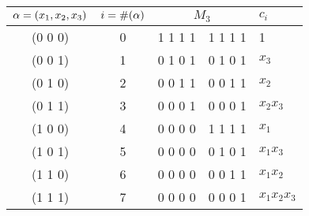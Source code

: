 \begin{center}
 \begin{tabular}{ c | c | c | l }
  $\alpha = (x_1, x_2, x_3)$ & $i = \#(\alpha)$ & $M_3$ & $c_i$ \\
  \hline
  (0 0 0) & 	0	& 1 1 1 1\ \ 1 1 1 1 & 1 \T  \\
  (0 0 1) & 	1	& 0 1 0 1\ \ 0 1 0 1 & $x_3$     \\
  (0 1 0) & 	2	& 0 0 1 1\ \ 0 0 1 1 & $x_2$     \\
  (0 1 1) & 	3	& 0 0 0 1\ \ 0 0 0 1 & $x_2x_3$   \\
  (1 0 0) & 	4	& 0 0 0 0\ \ 1 1 1 1 & $x_1$     \\
  (1 0 1) & 	5	& 0 0 0 0\ \ 0 1 0 1 & $x_1x_3$   \\
  (1 1 0) & 	6	& 0 0 0 0\ \ 0 0 1 1 & $x_1x_2$   \\
  (1 1 1) & 	7	& 0 0 0 0\ \ 0 0 0 1 & $x_1x_2x_3$ \B \\
  \hline
  \end{tabular}
\end{center}
  
